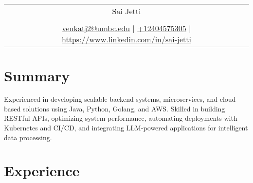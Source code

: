 \documentclass[a4paper,3pt]{article}
\begin{document}
\pagestyle{empty} 


\begin{tabularx}{\linewidth}{@{} C @{}}
\color[HTML]{1C033C} \Huge{Sai Jetti} \\[0.5pt]
\\
{\href{mailto: venkatj2@umbc.edu}{\raisebox{-0.05\height}{\faEnvelope} venkatj2@umbc.edu} $|$}
{\href{tel:+12404575305}{\raisebox{-0.05\height}{\faMobile} +12404575305}  $|$}
{\href{https://www.linkedin.com/in/sai-jetti}{\raisebox{-0.05\height}{\faLinkedin} https://www.linkedin.com/in/sai-jetti}}
\end{tabularx}

\section{Summary}
Experienced in developing scalable backend systems, microservices, and cloud-based solutions using Java, Python, Golang, and AWS. Skilled in building RESTful APIs, optimizing system performance, automating deployments with Kubernetes and CI/CD, and integrating LLM-powered applications for intelligent data processing.

\section{Experience}
\end{document}
